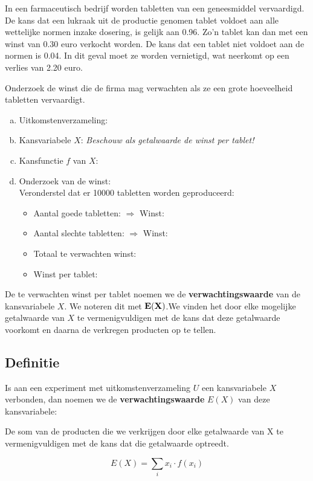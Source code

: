 \documentclass[a4paper,12pt, twoside]{article}
\begin{document}
\begin{oefening}
In een farmaceutisch bedrijf worden tabletten van een geneesmiddel vervaardigd. De kans dat een lukraak uit de productie genomen tablet voldoet aan alle wettelijke normen inzake dosering, is gelijk aan 0.96. Zo’n tablet kan dan met een winst van 0.30 euro verkocht worden. De kans dat een tablet niet voldoet aan de normen is 0.04. In dit geval moet ze worden vernietigd, wat neerkomt op een verlies van 2.20 euro.

Onderzoek de winst die de firma mag verwachten als ze een grote hoeveelheid tabletten vervaardigt.

\begin{enumerate}[(a)]
  \item Uitkomstenverzameling: \arulefill
  \item Kansvariabele $X$: {\em Beschouw als getalwaarde de winst per tablet!}
  \item Kansfunctie $f$ van $X$: \arulefill
  \item Onderzoek van de winst:\\
  Veronderstel dat er 10000 tabletten worden geproduceerd:\\
  \begin{itemize}
    \itemsep1em
    \item Aantal goede tabletten: \arulefill
          $\Rightarrow$ Winst: \arulefill
    \item Aantal slechte tabletten:  \arulefill
          $\Rightarrow$ Winst: \arulefill
    \item Totaal te verwachten winst: \arulefill
    \item Winst per tablet: \arulefill
  \end{itemize}
\end{enumerate}
\end{oefening}

De te verwachten winst per tablet noemen we de {\bf verwachtingswaarde} van de kansvariabele $X$. We noteren dit met $\bf E(X)$.We vinden het door elke mogelijke getalwaarde van $X$ te vermenigvuldigen met de kans dat deze getalwaarde voorkomt en daarna de verkregen producten op te tellen.

\pagebreak
\subsection{Definitie}

\begin{mdframed}
Is aan een experiment met uitkomstenverzameling $U$ een kansvariabele $X$ verbonden, dan noemen we de {\bf verwachtingswaarde} $E(X)$ van deze kansvariabele:

De som van de producten die we verkrijgen door elke getalwaarde van X te vermenigvuldigen met de kans dat die getalwaarde optreedt.

$$E(X)=\sum_i x_i\cdot f(x_i)$$
\end{mdframed}
\end{document}
